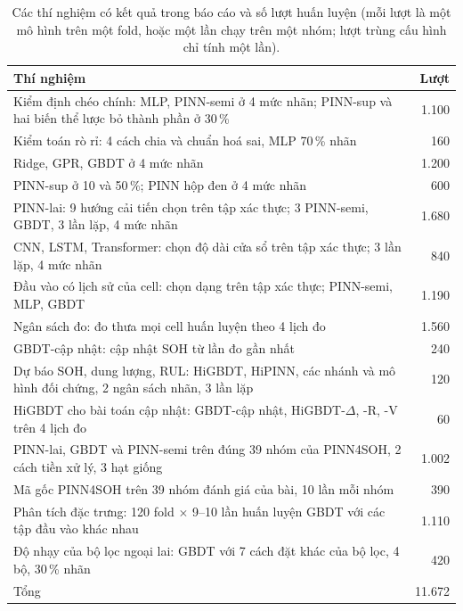 \begin{table}[!t]\centering\small
\caption[Các thí nghiệm có kết quả trong báo cáo]{Các thí nghiệm có kết quả trong báo cáo và số lượt huấn luyện (mỗi lượt là một mô hình trên một fold, hoặc một lần chạy trên một nhóm; lượt trùng cấu hình chỉ tính một lần).}\label{tab:exps}
\begin{tabularx}{\textwidth}{>{\raggedright\arraybackslash}X r}\toprule
Thí nghiệm & Lượt \\\midrule
Kiểm định chéo chính: MLP, PINN-semi ở 4 mức nhãn; PINN-sup và hai biến thể lược bỏ thành phần ở 30\,\% & 1.100 \\
Kiểm toán rò rỉ: 4 cách chia và chuẩn hoá sai, MLP 70\,\% nhãn & 160 \\
Ridge, GPR, GBDT ở 4 mức nhãn & 1.200 \\
PINN-sup ở 10 và 50\,\%; PINN hộp đen ở 4 mức nhãn & 600 \\
PINN-lai: 9 hướng cải tiến chọn trên tập xác thực; 3 PINN-semi, GBDT, 3 lần lặp, 4 mức nhãn & 1.680 \\
CNN, LSTM, Transformer: chọn độ dài cửa sổ trên tập xác thực; 3 lần lặp, 4 mức nhãn & 840 \\
Đầu vào có lịch sử của cell: chọn dạng trên tập xác thực; PINN-semi, MLP, GBDT & 1.190 \\
Ngân sách đo: đo thưa mọi cell huấn luyện theo 4 lịch đo & 1.560 \\
GBDT-cập nhật: cập nhật SOH từ lần đo gần nhất & 240 \\
Dự báo SOH, dung lượng, RUL: HiGBDT, HiPINN, các nhánh và mô hình đối chứng, 2 ngân sách nhãn, 3 lần lặp & 120 \\
HiGBDT cho bài toán cập nhật: GBDT-cập nhật, HiGBDT-$\Delta$, -R, -V trên 4 lịch đo & 60 \\
PINN-lai, GBDT và PINN-semi trên đúng 39 nhóm của PINN4SOH, 2 cách tiền xử lý, 3 hạt giống & 1.002 \\
Mã gốc PINN4SOH trên 39 nhóm đánh giá của bài, 10 lần mỗi nhóm & 390 \\
Phân tích đặc trưng: 120 fold $\times$ 9--10 lần huấn luyện GBDT với các tập đầu vào khác nhau & 1.110 \\
Độ nhạy của bộ lọc ngoại lai: GBDT với 7 cách đặt khác của bộ lọc, 4 bộ, 30\,\% nhãn & 420 \\
\midrule
Tổng & 11.672 \\
\bottomrule\end{tabularx}\end{table}
